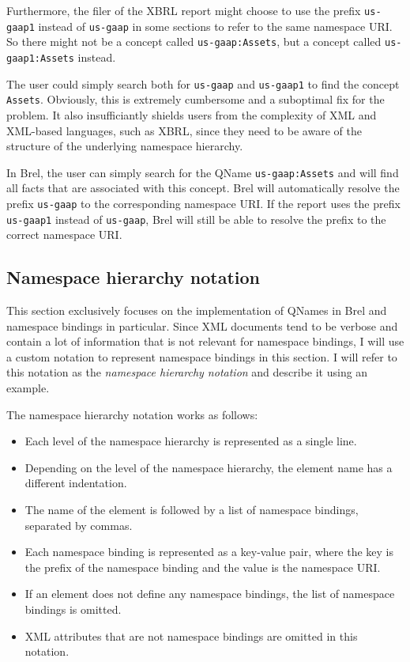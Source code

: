 Furthermore, the filer of the XBRL report might choose to use the prefix \texttt{us-gaap1} instead of \texttt{us-gaap} in some sections to refer to the same namespace URI.
So there might not be a concept called \texttt{us-gaap:Assets}, but a concept called \texttt{us-gaap1:Assets} instead.

The user could simply search both for \texttt{us-gaap} and \texttt{us-gaap1} to find the concept \texttt{Assets}.
Obviously, this is extremely cumbersome and a suboptimal fix for the problem.
It also insufficiantly shields users from the complexity of XML and XML-based languages, such as XBRL, 
since they need to be aware of the structure of the underlying namespace hierarchy.

In Brel, the user can simply search for the QName \texttt{us-gaap:Assets} and will find all facts that are associated with this concept.
Brel will automatically resolve the prefix \texttt{us-gaap} to the corresponding namespace URI.
If the report uses the prefix \texttt{us-gaap1} instead of \texttt{us-gaap}, Brel will still be able to resolve the prefix to the correct namespace URI.

\subsection{Namespace hierarchy notation}

This section exclusively focuses on the implementation of QNames in Brel and namespace bindings in particular. 
Since XML documents tend to be verbose and contain a lot of information that is not relevant for namespace bindings,
I will use a custom notation to represent namespace bindings in this section. 
I will refer to this notation as the \textit{namespace hierarchy notation} and describe it using an example.

The namespace hierarchy notation works as follows:

\begin{itemize}
    \item Each level of the namespace hierarchy is represented as a single line.
    \item Depending on the level of the namespace hierarchy, the element name has a different indentation.
    \item The name of the element is followed by a list of namespace bindings, separated by commas.
    \item Each namespace binding is represented as a key-value pair, where the key is the prefix of the namespace binding and the value is the namespace URI.
    \item If an element does not define any namespace bindings, the list of namespace bindings is omitted.
    \item XML attributes that are not namespace bindings are omitted in this notation.
\end{itemize}

